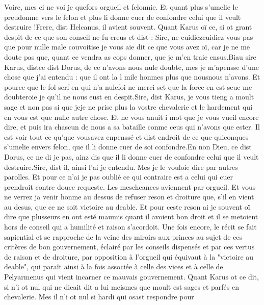 \documentclass{article}
\begin{document}
\begin{pages}
      Voire, mes ci ne voi je 
      quefors orgueil et felonnie. 
   Et quant plus s’umelie le preudonme vers le felon et plus li donne cuer de confondre celui que il veult destruire !Frere, dist Helcanus, il avient souvent.
   Quant Karus oï ce, si ot grant despit de ce que son conseil ne fu creus et dist :
   Sire, ne cuidiezcuidiez vous pas que 
      pour nulle male couvoitise je vous aie dit ce que vous avez oï, 
   car je ne me doute pas que, quant ce vendra as cops donner, que je m’en traie ensus.Biau sire Karus, 
      distce dist Dorus, de ce n’avons nous nule 
      doubte, mes je m’apensse d’une chose que j’ai entendu : que il ont la 
      l mile honmes plus que 
      nousnous n'avons. Et pource que le fol serf en qui 
      n’a nulefoi ne merci set que la force en est seue me doubteroie 
   je qu’il ne nous eust en despit.Sire, dist Karus, je vous tieng a moult sage 
      et non pas si que jeje ne prise plus la vostre chevalerie 
      et le hardement qui en vous est que nulle autre chose. Et ne vous anuit i mot que je vous vueil encore dire, 
      et puis ira chascun de nous a sa bataille conme ceus qui n’avons que ester. Il est voir tout ce 
      qu’que vousavez enpenssé et dist endroit de ce que 
   quiconques s’umelie envers felon, que il li donne cuer de soi confondre.En non Dieu, ce dist 
      Dorus, ce ne di je pas, 
   ainz dis que il li donne cuer de confondre celui que il veult destruire.Sire, dist il, ainsi l’ai je entendu. Mes je le vouloie dire par autres parolles. 
   Et pour ce n’ai je pas oublié ce qui contraire est a celui qui cuer prendroit contre douce requeste. 
   Les mescheances aviennent par orgueil. Et vous ne verrez ja venir honme au dessus de refuser reson et droiture que, 
   s’il en vient au desus, que ce ne soit victoire au deable. Et pour ceste reson ai je souvent oï dire que plusseurs en ont esté 
   maumis quant il avoient bon droit et il se metoient hors de conseil qui a humilité et raison s’acordoit.
   Une fois encore, le récit se fait sapiential et se rapproche de la veine des miroirs aux princes 
   au sujet de ces critères de bon gouvernement, éclairé par les conseils dispensés et par ces vertus de raison et de droiture,
   par opposition à l'orgueil qui équivaut à la "victoire au deable", qui paraît ainsi à la fois associée à celle des vices et à 
   celle de Pelyarmenus qui vient incarner ce mauvais gouvernement. \pend
\pstart Quant Karus ot ce dit, si n’i ot nul qui ne 
   dieait dit a lui meismes que 
   moult est sages et parfés en chevalerie. Mes il n’i ot nul si hardi qui osast respondre pour 

\end{pages}
\end{document}
